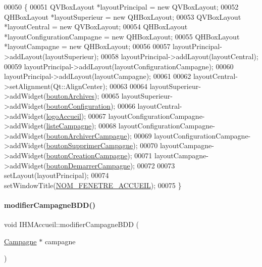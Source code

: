 \begin{DoxyCode}
00050 \{
00051     QVBoxLayout *layoutPrincipal = \textcolor{keyword}{new} QVBoxLayout;
00052     QHBoxLayout *layoutSuperieur = \textcolor{keyword}{new} QHBoxLayout;
00053     QVBoxLayout *layoutCentral = \textcolor{keyword}{new} QVBoxLayout;
00054     QHBoxLayout *layoutConfigurationCampagne = \textcolor{keyword}{new} QHBoxLayout;
00055     QHBoxLayout *layoutCampagne = \textcolor{keyword}{new} QHBoxLayout;
00056 
00057     layoutPrincipal->addLayout(layoutSuperieur);
00058     layoutPrincipal->addLayout(layoutCentral);
00059     layoutPrincipal->addLayout(layoutConfigurationCampagne);
00060     layoutPrincipal->addLayout(layoutCampagne);
00061 
00062     layoutCentral->setAlignment(Qt::AlignCenter);
00063 
00064     layoutSuperieur->addWidget(\hyperlink{class_i_h_m_accueil_a313a8c52763aa2978010db77ec6673ac}{boutonArchives});
00065     layoutSuperieur->addWidget(\hyperlink{class_i_h_m_accueil_a8b8ed7d11ab66e3c6895b3c6129dc9c8}{boutonConfiguration});
00066     layoutCentral->addWidget(\hyperlink{class_i_h_m_accueil_a709440124f3307589eee68c517833e6d}{logoAccueil});
00067     layoutConfigurationCampagne->addWidget(\hyperlink{class_i_h_m_accueil_afb828a4e06c25afa40341c310cd85b08}{listeCampagne});
00068     layoutConfigurationCampagne->addWidget(\hyperlink{class_i_h_m_accueil_a96d64cf254c0645eb45c317858b0a0f3}{boutonArchiverCampagne});
00069     layoutConfigurationCampagne->addWidget(\hyperlink{class_i_h_m_accueil_afb409fb4395372f35f9f8699fcb4c89b}{boutonSupprimerCampagne});
00070     layoutCampagne->addWidget(\hyperlink{class_i_h_m_accueil_a4186b4ef6a9c63f5b3c6431626ff3268}{boutonCreationCampagne});
00071     layoutCampagne->addWidget(\hyperlink{class_i_h_m_accueil_a9fd8ab3abc0c1e6addd70c8d7c46fb65}{boutonDemarrerCampagne});
00072 
00073     setLayout(layoutPrincipal);
00074     setWindowTitle(\hyperlink{ihmaccueil_8h_a26ff7f60eb1bfd16fed17fed2d65c865}{NOM\_FENETRE\_ACCUEIL});
00075 \}
\end{DoxyCode}
\mbox{\label{class_i_h_m_accueil_a7f1e5f71843a99cb44e3efb7191a6d07}} 
\paragraph{\texorpdfstring{modifier\+Campagne\+B\+D\+D()}{modifierCampagneBDD()}}
{\footnotesize\ttfamily void I\+H\+M\+Accueil\+::modifier\+Campagne\+B\+DD (\begin{DoxyParamCaption}\item[{\hyperlink{class_campagne}{Campagne} $\ast$}]{campagne }\end{DoxyParamCaption})}



